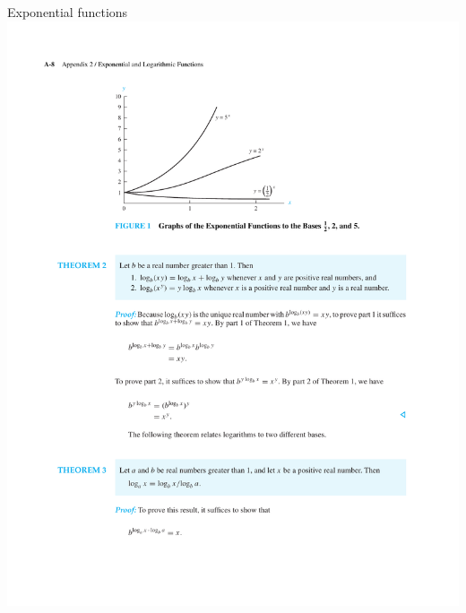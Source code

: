 \documentclass{beamer}
\theoremstyle{definition}
\begin{document}
\begin{frame}{Exponential functions}
    \centering \includegraphics[trim={2cm 18.5cm 4cm 3cm},clip,width=\linewidth]{a-8}
\end{frame}
\end{document}
